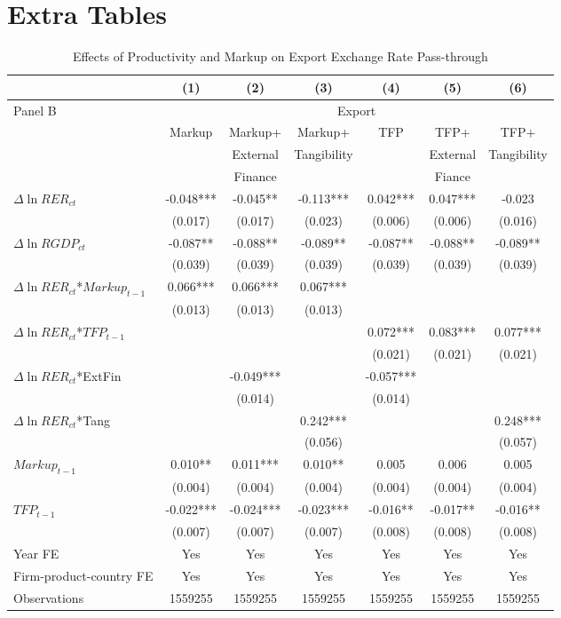 \chapter{Extra Tables}\label{sec-appendix}

\begin{table}[htbp]
	\centering
	\caption{Effects of Productivity and Markup on Export Exchange Rate Pass-through}
	\begin{tabular}{lcccccc}
		\midrule         & (1)   & (2)   & (3)   & (4)   & (5)   & (6) \\
		\midrule
		Panel B & \multicolumn{6}{c}{Export} \\
		& Markup & Markup+ & Markup+ & TFP   & TFP+  & TFP+ \\
		&       & External & Tangibility &       & External & Tangibility \\
		&       & Finance &  	&       & Fiance &  \\
		\midrule
		$\Delta \ln RER_{ct}$ & -0.048*** & -0.045** & -0.113*** & 0.042*** & 0.047*** & -0.023 \\
		& (0.017) & (0.017) & (0.023) & (0.006) & (0.006) & (0.016) \\
		$\Delta \ln RGDP_{ct}$ & -0.087** & -0.088** & -0.089** & -0.087** & -0.088** & -0.089** \\
		& (0.039) & (0.039) & (0.039) & (0.039) & (0.039) & (0.039) \\
		$\Delta \ln RER_{ct}$*$Markup_{t-1}$ & 0.066*** & 0.066*** & 0.067*** &       &       &  \\
		& (0.013) & (0.013) & (0.013) &       &       &  \\
		$\Delta \ln RER_{ct}$*$TFP_{t-1}$ &       &       &       & 0.072*** & 0.083*** & 0.077*** \\
		&       &       &       & (0.021) & (0.021) & (0.021) \\
		$\Delta \ln RER_{ct}$*ExtFin &       & -0.049*** &       & -0.057*** &       &  \\
		&       & (0.014) &       & (0.014) &       &  \\
		$\Delta \ln RER_{ct}$*Tang &       &       & 0.242*** &       &       & 0.248*** \\
		&       &       & (0.056) &       &       & (0.057) \\
		$Markup_{t-1}$ & 0.010** & 0.011*** & 0.010** & 0.005 & 0.006 & 0.005 \\
		& (0.004) & (0.004) & (0.004) & (0.004) & (0.004) & (0.004) \\
		$TFP_{t-1}$ & -0.022*** & -0.024*** & -0.023*** & -0.016** & -0.017** & -0.016** \\
		& (0.007) & (0.007) & (0.007) & (0.008) & (0.008) & (0.008) \\
		Year FE  & Yes   & Yes   & Yes   & Yes   & Yes   & Yes \\
		Firm-product-country FE & Yes   & Yes   & Yes   & Yes   & Yes   & Yes \\
		Observations & 1559255 & 1559255 & 1559255 & 1559255 & 1559255 & 1559255 \\
		\bottomrule
	\end{tabular}
	\label{tabA.1}
\end{table}

